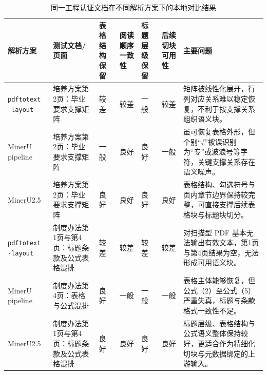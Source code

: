 \begin{table}[htbp]
\centering
\caption{同一工程认证文档在不同解析方案下的本地对比结果}
\label{tab:local_parser_compare}
\footnotesize
\renewcommand{\arraystretch}{1.2}
\begin{tabular}{p{1.8cm}p{2.5cm}p{1.6cm}p{1.8cm}p{1.7cm}p{1.9cm}p{3.1cm}}
\hline
解析方案 & 测试文档/页面 & 表格结构保留 & 阅读顺序一致性 & 标题层级保留 & 后续切块可用性 & 主要问题 \\
\hline
\texttt{pdftotext -layout} & 培养方案第2页：毕业要求支撑矩阵 & 较差 & 较差 & 一般 & 较差 & 矩阵被线性化展开，行列对应关系难以稳定恢复，不利于按支撑关系组织语义块。 \\
\hline
MinerU pipeline & 培养方案第2页：毕业要求支撑矩阵 & 一般 & 良好 & 良好 & 一般 & 虽可恢复表格外形，但个别“√”被误识别为“专”或波浪号等字符，关键支撑关系存在语义噪声。 \\
\hline
MinerU2.5 & 培养方案第2页：毕业要求支撑矩阵 & 良好 & 良好 & 良好 & 良好 & 表格结构、勾选符号与页内章节边界保持较完整，可直接支撑后续表格块与标题块切分。 \\
\hline
\texttt{pdftotext -layout} & 制度办法第1页与第4页：标题条款及公式表格混排 & 较差 & 较差 & 较差 & 较差 & 对扫描型 PDF 基本无法输出有效文本，第1页与第4页结果为空，无法形成可用语义块。 \\
\hline
MinerU pipeline & 制度办法第4页：表格与公式混排 & 良好 & 一般 & 一般 & 一般 & 表格主体能够恢复，但公式（2）至公式（5）严重失真，标题与条款格式一致性不足。 \\
\hline
MinerU2.5 & 制度办法第1页与第4页：标题条款及公式表格混排 & 良好 & 良好 & 良好 & 良好 & 标题层级、表格结构与公式语义整体保持较好，更适合作为精细化切块与元数据绑定的上游输入。 \\
\hline
\end{tabular}
\end{table}
